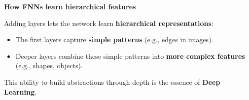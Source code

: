\highspace
\begin{flushleft}
    \textcolor{Green3}{ \textbf{How FNNs learn hierarchical features}}
\end{flushleft}
Adding layers lets the network learn \textbf{hierarchical representations}:
\begin{itemize}
    \item The first layers capture \textbf{simple patterns} (e.g., edges in images).
    \item Deeper layers combine these simple patterns into \textbf{more complex features} (e.g., shapes, objects).
\end{itemize}
This ability to build abstractions through depth is the essence of \textbf{Deep Learning}.